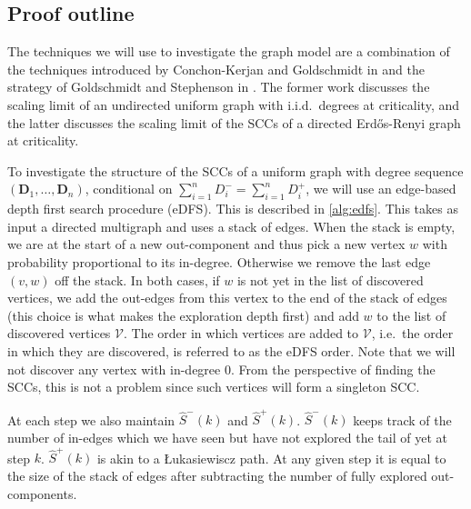 \subsection{Proof outline}

\def \exploredvertices {\mathcal V}
\def \explorededges {\mathcal E}
\def \forest {F}
\def \edgestack {\mathcal Q}

The techniques we will use to investigate the graph model are a combination of the techniques introduced by Conchon-Kerjan and Goldschmidt in \cite{conchon--kerjanStableGraphMetric2020} and the strategy of Goldschmidt and Stephenson in \cite{goldschmidtScalingLimitCritical2019}. The former work discusses the scaling limit of an undirected uniform graph with i.i.d.\ degrees at criticality, and the latter discusses the scaling limit of the SCCs of a directed Erd\H{o}s-Renyi graph at criticality.

To investigate the structure of the SCCs of a uniform graph with degree sequence $(\mathbf{D}_1,\dots,\mathbf{D}_n)$, conditional on $\sum_{i=1}^n D^-_i=\sum_{i=1}^n D^+_i$, we will use an edge-based depth first search procedure (eDFS). This is described in \cref{alg:edfs}. This takes as input a directed multigraph and uses a stack of edges. When the stack is empty, we are at the start of a new out-component and thus pick a new vertex $w$ with probability proportional to its in-degree. Otherwise we remove the last edge $(v, w)$ off the stack. In both cases, if $w$ is not yet in the list of discovered vertices, we add the out-edges from this vertex to the end of the stack of edges (this choice is what makes the exploration depth first) and add $w$ to the list of discovered vertices $\exploredvertices$.  The order in which vertices are added to $\exploredvertices$, i.e.\ the order in which they are discovered, is referred to as the eDFS order. Note that we will not discover any vertex with in-degree 0. From the perspective of finding the SCCs, this is not a problem since such vertices will form a singleton SCC.

At each step we also maintain $\hat{S}^-(k)$ and $\hat{S}^+(k)$. $\hat{S}^-(k)$ keeps track of the number of in-edges which we have seen but have not explored the tail of yet at step $k$. $\hat{S}^+(k)$ is akin to a \L{}ukasiewiscz path. At any given step it is equal to the size of the stack of edges after subtracting the number of fully explored out-components.

